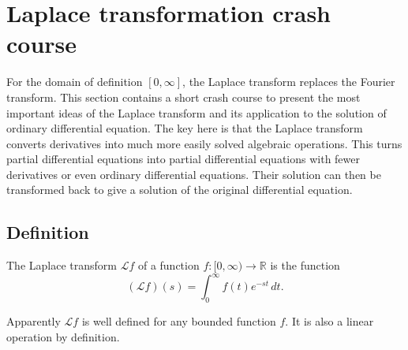 %
%
%
\section{Laplace transformation crash course}
For the domain of definition $[0,\infty]$, the Laplace transform
replaces the Fourier transform.
This section contains a short crash course to present the most important
ideas of the Laplace transform and its application to the solution
of ordinary differential equation.
The key here is that the Laplace transform converts derivatives into
much more easily solved algebraic operations.
This turns partial differential equations into partial differential equations
with fewer derivatives or even ordinary differential equations.
Their solution can then be transformed back to give a solution of the
original differential equation.

\subsection{Definition}
\begin{definition}
The Laplace transform $\mathscr{L}f$ of a function
$f\colon[0,\infty)\to\mathbb R$ is the function
\[
(\mathscr{L}f)(s)=\int_0^\infty f(t)e^{-st}\,dt.
\]
\end{definition}
Apparently $\mathscr{L}f$ is well defined for any bounded function $f$.
It is also a linear operation by definition.

